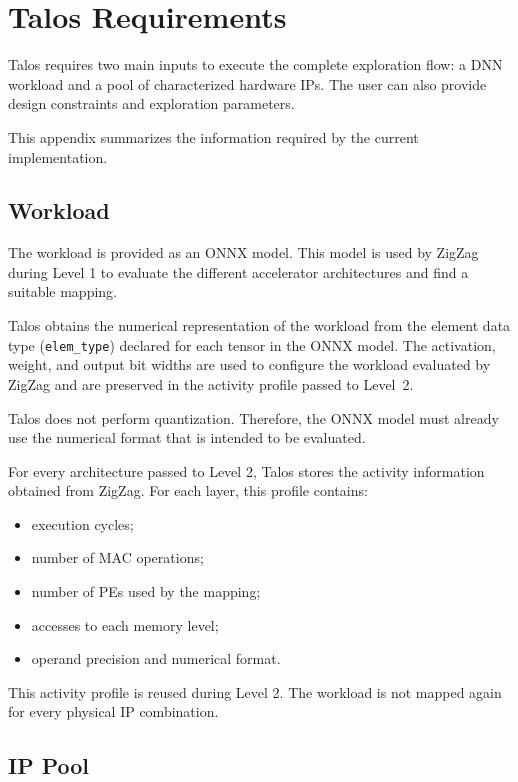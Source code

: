 \section{Talos Requirements}
\label{app:talos_requirements}

Talos requires two main inputs to execute the complete exploration
flow: a DNN workload and a pool of characterized hardware IPs. The
user can also provide design constraints and exploration parameters.

This appendix summarizes the information required by the current
implementation.

\subsection{Workload}

The workload is provided as an ONNX model. This model is used by
ZigZag during Level 1 to evaluate the different accelerator
architectures and find a suitable mapping.

Talos obtains the numerical representation of the workload from the
element data type (\texttt{elem\_type}) declared for each tensor in
the ONNX model. The activation, weight, and output bit
widths are used to configure the workload evaluated by ZigZag and are
preserved in the activity profile passed to Level~2.

Talos does not perform quantization. Therefore, the ONNX model must
already use the numerical format that is intended to be evaluated.

For every architecture passed to Level 2, Talos stores the activity
information obtained from ZigZag. For each layer, this profile
contains:

\begin{itemize}
    \item execution cycles;
    \item number of MAC operations;
    \item number of PEs used by the mapping;
    \item accesses to each memory level;
    \item operand precision and numerical format.
\end{itemize}

This activity profile is reused during Level 2. The workload is not
mapped again for every physical IP combination.


\subsection{IP Pool}

